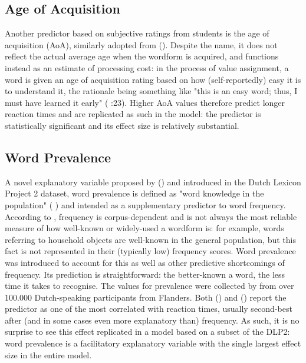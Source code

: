 \subsection{Age of Acquisition} \label{subsec:aoa}
Another predictor based on subjective ratings from students is the age of acquisition (AoA), similarly adopted from \citeauthor{Brysbaert+etal+2014} (\citeyear{Brysbaert+etal+2014}). Despite the name, it does not reflect the actual average age when the wordform is acquired, and functions instead as an estimate of processing cost: in the process of value assignment, a word is given an age of acquisition rating based on how (self-reportedly) easy it is to understand it, the rationale being something like "this is an easy word; thus, I must have learned it early" (\citeauthor{Brysbaert+etal+2016} \citeyear{Brysbaert+etal+2016}:23). Higher AoA values therefore predict longer reaction times and are replicated as such in the model: the predictor is statistically significant and its effect size is relatively substantial.
\subsection{Word Prevalence} \label{subsec:prevalence}
A novel explanatory variable proposed by \citeauthor{Keuleers+etal+2015} (\citeyear{Keuleers+etal+2015}) and introduced in the Dutch Lexicon Project 2 dataset, word prevalence is defined as "word knowledge in the population" (\citeauthor{Brysbaert+etal+2016} \citeyear{Brysbaert+etal+2016}) and intended as a supplementary predictor to word frequency. According to \citeauthor{Brysbaert+etal+2016}, frequency is corpus-dependent and is not always the most reliable measure of how well-known or widely-used a wordform is: for example, words referring to household objects are well-known in the general population, but this fact is not represented in their (typically low) frequency scores. Word prevalence was introduced to account for this as well as other predictive shortcomings of frequency. Its prediction is straightforward: the better-known a word, the less time it takes to recognise. The values for prevalence were collected by \citeauthor{Keuleers+etal+2015} from over 100.000 Dutch-speaking participants from Flanders. Both \citeauthor{Keuleers+etal+2015} (\citeyear{Keuleers+etal+2015}) and \citeauthor{Brysbaert+etal+2016} (\citeyear{Brysbaert+etal+2016}) report the predictor as one of the most correlated with reaction times, usually second-best after (and in some cases even more explanatory than) frequency. As such, it is no surprise to see this effect replicated in a model based on a subset of the DLP2: word prevalence is a facilitatory explanatory variable with the single largest effect size in the entire model.
